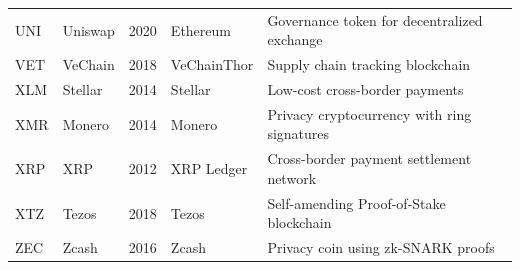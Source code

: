 \documentclass{article}
\begin{document}
\begin{longtable}{llllp{4.2cm}}
UNI & Uniswap & 2020 & Ethereum & Governance token for decentralized exchange \\[4pt]
VET & VeChain & 2018 & VeChainThor & Supply chain tracking blockchain \\[4pt]
XLM & Stellar & 2014 & Stellar & Low-cost cross-border payments \\[4pt]
XMR & Monero & 2014 & Monero & Privacy cryptocurrency with ring signatures \\[4pt]
XRP & XRP & 2012 & XRP Ledger & Cross-border payment settlement network \\[4pt]
XTZ & Tezos & 2018 & Tezos & Self-amending Proof-of-Stake blockchain \\[4pt]
ZEC & Zcash & 2016 & Zcash & Privacy coin using zk-SNARK proofs \\

\end{longtable}
\end{document}

